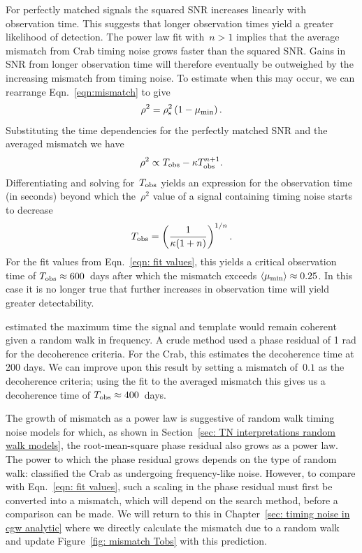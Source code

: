 \documentclass[../full_thesis/full_thesis.tex]{subfiles}
\begin{document}
For perfectly matched signals the squared SNR
increases linearly \citep{Prix2009} with observation time.
This suggests that longer observation
times yield a greater likelihood of detection. The power law fit with~$n > 1$
implies that the average mismatch from
Crab timing noise grows faster than the squared SNR.
Gains in
SNR from longer observation time will therefore eventually be
outweighed by the increasing mismatch from timing noise.
To estimate when this may occur, we can rearrange Eqn.~\eqref{eqn:mismatch}
to give
\begin{equation}
    \rho^{2} = \rho^{2}_{\mathrm{s}}\left(1 - \mu_{\mathrm{min}}\right).
\end{equation}
Substituting the time dependencies for the perfectly matched SNR and the
averaged mismatch we have
\begin{equation}
    \rho^{2} \propto T_{\mathrm{obs}} - \kappa T_{\mathrm{obs}}^{n+1}.
\end{equation}
Differentiating and solving for~$T_{\mathrm{obs}}$ yields an expression for the
observation time (in seconds)
beyond which the~$\rho^{2}$ value of a signal containing timing
noise starts to decrease
\begin{equation}
T_{\mathrm{obs}} = \left(\frac{1}{\kappa(1+n)}\right)^{1/n}.
\end{equation}
For the fit values from Eqn.~\eqref{eqn: fit values}, this yields
a critical observation time of
$T_{\mathrm{obs}}\approx 600$~days after which the mismatch exceeds
$\langle\mu_{\mathrm{min}}\rangle \approx 0.25$.
In this case it is no longer true that further increases in
observation time will yield greater detectability.

\citet{Jones2004} estimated the maximum time the signal and template would
remain coherent given a random walk in  frequency. A crude method used a
phase residual of 1 rad for the decoherence criteria. For the Crab, this
estimates the decoherence time at 200 days. We can improve upon this result by
setting a mismatch of~$0.1$ as the decoherence criteria; using the fit to the
averaged mismatch this gives us a decoherence time of $T_{\mathrm{obs}}\approx 400 $~days.

The growth of mismatch as a power law is suggestive of random walk
timing noise models for which, as shown in Section~\ref{sec: TN interpretations
random walk models}, the root-mean-square phase residual also grows as a power
law. The power to which the phase residual grows depends on the type of random
walk: \citep{Boynton1972, Cordes1981} classified the Crab as undergoing
frequency-like noise.  However, to compare with Eqn.~\eqref{eqn: fit values},
such a scaling in the phase residual must first be converted into a mismatch,
which will depend on the search method, before a comparison can be made. We
will return to this in Chapter~\ref{sec: timing noise in cgw analytic} where
we directly calculate the mismatch due to a random walk and update
Figure~\ref{fig: mismatch Tobs} with this prediction.
\end{document}
